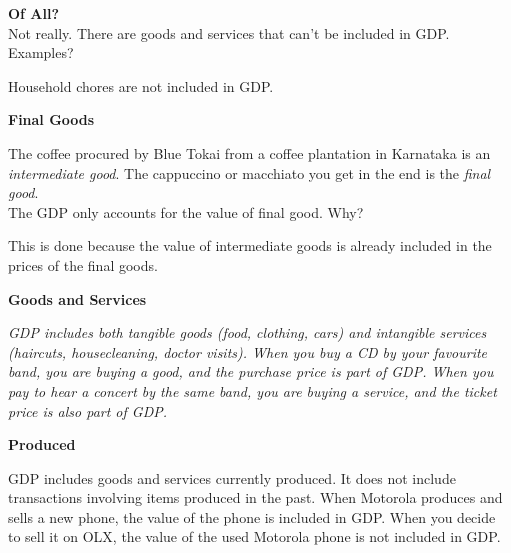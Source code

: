 \documentclass[shownotes,11pt, aspectratio=169]{beamer}
\begin{document}
\begin{frame}
\textbf{Of All?} \\
Not really. There are goods and services that can't be included in GDP. \\
Examples? \\
\vspace{2mm}
\pause

Household chores are not included in GDP.
\end{frame}

\begin{frame}
\textbf{Final Goods} \\
\vspace{2mm}

The coffee procured by Blue Tokai from a coffee plantation in Karnataka is an \textit{intermediate good}.
The cappuccino or macchiato you get in the end is the \textit{final good}. \\
The GDP only accounts for the value of final good. Why? 
\\
\vspace{3mm}

This is done because the value of intermediate goods is already included in the prices of the final goods.
\end{frame}

\begin{frame}
\textbf{Goods and Services}
\\
\vspace{3mm}

\textit{GDP includes both tangible goods (food, clothing, cars) and intangible services
(haircuts, housecleaning, doctor visits). When you buy a CD by your favourite
band, you are buying a good, and the purchase price is part of GDP. When you
pay to hear a concert by the same band, you are buying a service, and the ticket
price is also part of GDP.}

\end{frame}


\begin{frame}
\textbf{Produced}
\\
\vspace{3mm}

GDP includes goods and services currently produced. It does not include transactions
involving items produced in the past. When Motorola produces and
sells a new phone, the value of the phone is included in GDP. When you decide to sell it on OLX, the value of the used Motorola phone is not included in GDP.
\end{frame}
\end{document}
